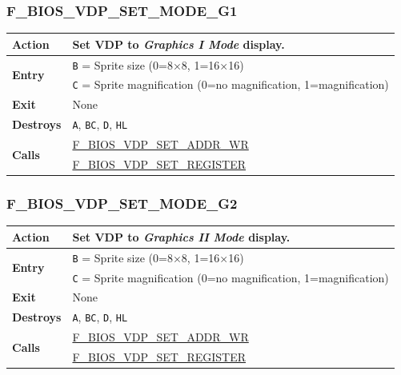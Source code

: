 \documentclass[a4paper,11pt]{article}
\begin{document}
        \subsubsection{F\_BIOS\_VDP\_SET\_MODE\_G1}
        \label{func:fbiosvdpsetmodeg1}
        \begin{tabular}{l p{9cm}}
            \hline\textbf{Action}
            & Set \textbf{VDP} to \textit{Graphics I Mode} display.\\
            \hline\multirow[t]{2}{4em}{\textbf{Entry}}
            & \texttt{B} = Sprite size (0=8×8, 1=16×16)\\
            & \texttt{C} = Sprite magnification (0=no magnification,
                1=magnification)\\
            \hline\textbf{Exit} & None\\
            \hline\textbf{Destroys} & \texttt{A}, \texttt{BC}, \texttt{D},
            \texttt{HL} \\
            \hline\multirow[t]{2}{4em}{\textbf{Calls}}
            & \hyperref[func:fbiosvdpsetaddrwr]{F\_BIOS\_VDP\_SET\_ADDR\_WR}\\
            & \hyperref[func:fbiosvdpsetregister]{F\_BIOS\_VDP\_SET\_REGISTER}\\
            \hline
        \end{tabular}

        \subsubsection{F\_BIOS\_VDP\_SET\_MODE\_G2}
        \label{func:fbiosvdpsetmodeg2}
        \begin{tabular}{l p{9cm}}
            \hline\textbf{Action}
            & Set \textbf{VDP} to \textit{Graphics II Mode} display.\\
            \hline\multirow[t]{2}{4em}{\textbf{Entry}}
            & \texttt{B} = Sprite size (0=8×8, 1=16×16)\\
            & \texttt{C} = Sprite magnification (0=no magnification,
                1=magnification)\\
            \hline\textbf{Exit} & None\\
            \hline\textbf{Destroys} & \texttt{A}, \texttt{BC}, \texttt{D},
            \texttt{HL} \\
            \hline\multirow[t]{2}{4em}{\textbf{Calls}}
            & \hyperref[func:fbiosvdpsetaddrwr]{F\_BIOS\_VDP\_SET\_ADDR\_WR}\\
            & \hyperref[func:fbiosvdpsetregister]{F\_BIOS\_VDP\_SET\_REGISTER}\\
            \hline
        \end{tabular}
\end{document}
